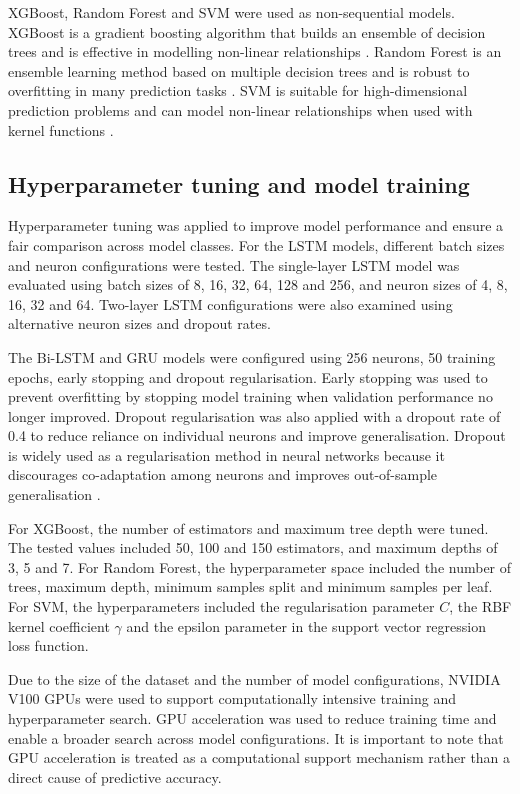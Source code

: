 XGBoost, Random Forest and SVM were used as non-sequential models. XGBoost is a gradient boosting algorithm that builds an ensemble of decision trees and is effective in modelling non-linear relationships \citep{chen2016xgboost}. Random Forest is an ensemble learning method based on multiple decision trees and is robust to overfitting in many prediction tasks \citep{breiman2001random}. SVM is suitable for high-dimensional prediction problems and can model non-linear relationships when used with kernel functions \citep{cortes1995support}.

\subsection{Hyperparameter tuning and model training}

Hyperparameter tuning was applied to improve model performance and ensure a fair comparison across model classes. For the LSTM models, different batch sizes and neuron configurations were tested. The single-layer LSTM model was evaluated using batch sizes of 8, 16, 32, 64, 128 and 256, and neuron sizes of 4, 8, 16, 32 and 64. Two-layer LSTM configurations were also examined using alternative neuron sizes and dropout rates.

The Bi-LSTM and GRU models were configured using 256 neurons, 50 training epochs, early stopping and dropout regularisation. Early stopping was used to prevent overfitting by stopping model training when validation performance no longer improved. Dropout regularisation was also applied with a dropout rate of 0.4 to reduce reliance on individual neurons and improve generalisation. Dropout is widely used as a regularisation method in neural networks because it discourages co-adaptation among neurons and improves out-of-sample generalisation \citep{srivastava2014dropout}.

For XGBoost, the number of estimators and maximum tree depth were tuned. The tested values included 50, 100 and 150 estimators, and maximum depths of 3, 5 and 7. For Random Forest, the hyperparameter space included the number of trees, maximum depth, minimum samples split and minimum samples per leaf. For SVM, the hyperparameters included the regularisation parameter $C$, the RBF kernel coefficient $\gamma$ and the epsilon parameter in the support vector regression loss function.

Due to the size of the dataset and the number of model configurations, NVIDIA V100 GPUs were used to support computationally intensive training and hyperparameter search. GPU acceleration was used to reduce training time and enable a broader search across model configurations. It is important to note that GPU acceleration is treated as a computational support mechanism rather than a direct cause of predictive accuracy.

